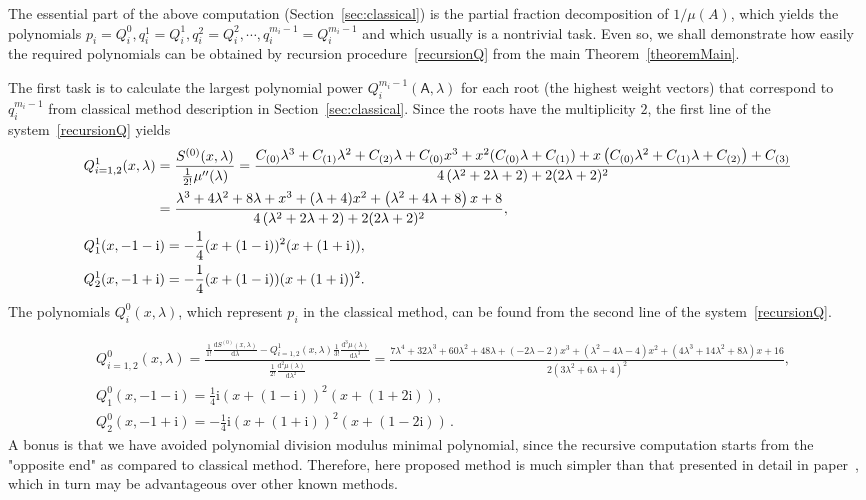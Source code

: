 \documentclass[AMA,STIX1COL]{WileyNJD-v2}
\def\m#1{\mathsf{#1}} %
\newcommand{\ii}{\mathrm{i}}
\newcommand{\dd}{\mathrm{d}} %
\def\m#1{\mathsf{#1}}%
\begin{document}
\begin{eexample}
The essential part of the above computation (Section~\ref{sec:classical}) is the partial
fraction decomposition of $1/\mu(A)$, which yields the polynomials $p_i=Q_i^{0},q_i^1=Q_i^{1}, q_i^2=Q_i^{2},\cdots,q_i^{m_i-1}=Q_i^{m_i-1}$
and which usually is a nontrivial task. Even so, we shall demonstrate how easily the required
polynomials  can be obtained by recursion procedure~\eqref{recursionQ} from the main
Theorem~\ref{theoremMain}.

The first task is to calculate the largest polynomial power $Q_i^{m_i-1}(\m{A},\lambda)$ for each root (the
highest weight vectors) that correspond to $q_i^{m_i-1}$ from classical method description in Section~\ref{sec:classical}.  Since the roots have
the multiplicity  $2$, the first line of the system~\eqref{recursionQ} yields
\begin{align*}
  &Q^{1}_{i=1,2}(x,\lambda)=\frac{S^{(0)}(x,\lambda)}{\frac{1}{2!}\mu^{\prime\prime}(\lambda)}=\frac{C_{(0)} \lambda ^3+C_{(1)} \lambda ^2+C_{(2)} \lambda +C_{(0)} x^3+x^2 (C_{(0)} \lambda +C_{(1)})+x \left(C_{(0)} \lambda ^2+C_{(1)} \lambda +C_{(2)}\right)+C_{(3)}}{4 \left(\lambda ^2+2 \lambda +2\right)+2 (2 \lambda +2)^2}
  \\&\hphantom{Q^{1}_{i=1,2}(x,\lambda)}=\frac{\lambda ^3+4 \lambda ^2+8 \lambda +x^3+(\lambda +4) x^2+\left(\lambda ^2+4 \lambda +8\right) x+8}{4 \left(\lambda ^2+2 \lambda +2\right)+2 (2 \lambda +2)^2},
  \\&Q^{1}_1(x,-1-\ii)=-\frac{1}{4} (x+(1-\ii))^2 (x+(1+\ii)),
\\&Q^{1}_2(x,-1+\ii)=-\frac{1}{4} (x+(1-\ii)) (x+(1+\ii))^2.
\end{align*}
  The polynomials $Q_i^{0}(x,\lambda)$, which represent $p_i$ in the classical method, can be found
  from the second line of the system~\eqref{recursionQ}.

\begin{align*}
  &Q^{0}_{i=1,2}(x,\lambda)=\frac{\frac{1}{1!}\frac{\dd S^{(0)}(x,\lambda)}{\dd \lambda}- Q^{1}_{i=1,2}(x,\lambda)\frac{1}{3!}\frac{\dd^3 \mu(\lambda)}{\dd \lambda^3}}{\frac{1}{2!}\frac{\dd^2 \mu(\lambda)}{\dd \lambda^2}} ={\textstyle\frac{7 \lambda ^4+32 \lambda ^3+60 \lambda ^2+48 \lambda +(-2 \lambda -2) x^3+\left(\lambda ^2-4 \lambda -4\right) x^2+\left(4 \lambda ^3+14 \lambda ^2+8 \lambda \right)
   x+16}{2 \left(3 \lambda ^2+6 \lambda +4\right)^2}},
  \\&Q^{0}_{1}(x,-1-\ii)= \frac{1}{4} \ii (x+(1-\ii))^2 (x+(1+2 \ii)),
\\&Q^{0}_{2}(x,-1+\ii)=-\frac{1}{4} \ii (x+(1+\ii))^2 (x+(1-2 \ii))\,.
\end{align*}
A bonus is that we have avoided polynomial division modulus minimal polynomial,
since the recursive computation starts from the "opposite end" as compared to  classical method.
Therefore, here proposed method is much simpler than that presented in detail in paper~\cite{Sobczyk1997},
which in turn may be advantageous over other known methods.
\end{eexample}
\end{document}

